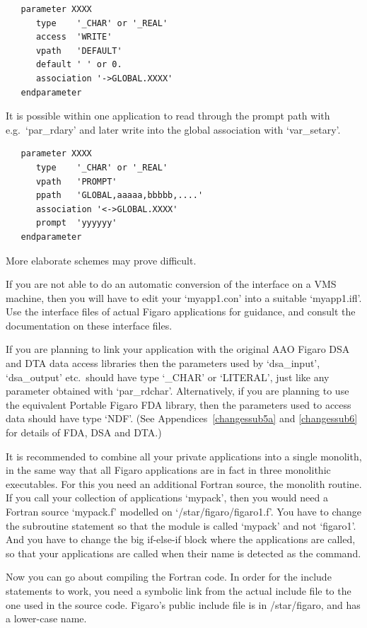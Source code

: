 \documentclass[11pt,twoside]{article}
\begin{document}
\begin{verbatim}
   parameter XXXX
      type    '_CHAR' or '_REAL'
      access  'WRITE'
      vpath   'DEFAULT'
      default ' ' or 0.
      association '->GLOBAL.XXXX'
   endparameter
\end{verbatim}

   It is possible within one application to read through the prompt path
   with e.g.\ `par\_rdary' and later write into the global association
   with `var\_setary'.

\begin{verbatim}
   parameter XXXX
      type    '_CHAR' or '_REAL'
      vpath   'PROMPT'
      ppath   'GLOBAL,aaaaa,bbbbb,....'
      association '<->GLOBAL.XXXX'
      prompt  'yyyyyy'
   endparameter
\end{verbatim}

   More elaborate schemes may prove difficult.

   If you are not able to do an automatic conversion of the interface on
   a VMS machine, then you will have to edit your `myapp1.con' into a
   suitable `myapp1.ifl'. Use the interface files of actual Figaro
   applications for guidance, and consult the documentation on these
   interface files.

   If you are planning to link your application with the original AAO
   Figaro DSA and DTA data access libraries then the parameters used by
   `dsa\_input', `dsa\_output' etc.\ should have type `\_CHAR' or `LITERAL',
   just like any parameter obtained with `par\_rdchar'.  Alternatively, if
   you are planning to use the equivalent Portable Figaro FDA library, then
   the parameters used to access data should have type `NDF'.  (See
   Appendices~\ref{changessub5a} and \ref{changessub6} for details of FDA,
   DSA and DTA.)

   It is recommended to combine all your private applications into a
   single monolith, in the same way that all Figaro applications are in
   fact in three monolithic executables. For this you need an additional
   Fortran source, the monolith routine. If you call your collection of
   applications `mypack', then you would need a Fortran source
   `mypack.f' modelled on `/star/figaro/figaro1.f'. You have to
   change the subroutine statement so that the module is called `mypack'
   and not `figaro1'. And you have to change the big if-else-if block
   where the applications are called, so that your applications are
   called when their name is detected as the command.

   Now you can go about compiling the Fortran code. In order for the
   include statements to work, you need a symbolic link from the actual
   include file to the one used in the source code. Figaro's public
   include file is in /star/figaro, and has a lower-case name.
\end{document}
